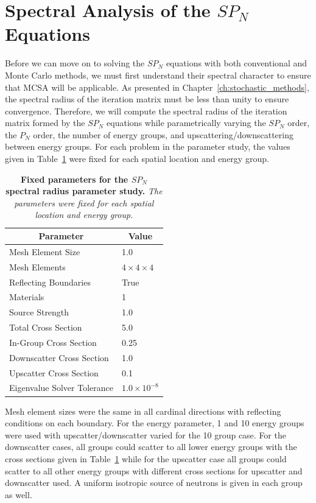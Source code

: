 \section{Spectral Analysis of the $SP_N$ Equations}
\label{sec:spn_spectral_analysis}
Before we can move on to solving the $SP_N$ equations with both
conventional and Monte Carlo methods, we must first understand their
spectral character to ensure that MCSA will be applicable. As
presented in Chapter~\ref{ch:stochastic_methods}, the spectral radius
of the iteration matrix must be less than unity to ensure
convergence. Therefore, we will compute the spectral radius of the
iteration matrix formed by the $SP_N$ equations while parametrically
varying the $SP_N$ order, the $P_N$ order, the number of energy
groups, and upscattering/downscattering between energy groups. For
each problem in the parameter study, the values given in
Table~\ref{tab:spn_fixed_parameters} were fixed for each spatial
location and energy group.
\begin{table}[h!]
  \begin{center}
    \begin{tabular}{ll}\hline\hline
      \multicolumn{1}{c}{Parameter}& 
      \multicolumn{1}{c}{Value} \\\hline
      Mesh Element Size & 1.0 \\
      Mesh Elements & $4 \times 4 \times 4$ \\
      Reflecting Boundaries & True \\
      Materials & 1 \\
      Source Strength & 1.0 \\
      Total Cross Section & 5.0 \\
      In-Group Cross Section & 0.25 \\
      Downscatter Cross Section & 1.0 \\
      Upscatter Cross Section & 0.1 \\
      Eigenvalue Solver Tolerance & $1.0\times10^{-8}$ \\
      \hline\hline
    \end{tabular}
  \end{center}
  \caption{\textbf{Fixed parameters for the $SP_N$ spectral radius
      parameter study.} \textit{The parameters were fixed for each
      spatial location and energy group.}}
  \label{tab:spn_fixed_parameters}
\end{table}
Mesh element sizes were the same in all cardinal directions with
reflecting conditions on each boundary. For the energy parameter, 1
and 10 energy groups were used with upscatter/downscatter varied for
the 10 group case. For the downscatter cases, all groups could scatter
to all lower energy groups with the cross sections given in
Table~\ref{tab:spn_fixed_parameters} while for the upscatter case all
groups could scatter to all other energy groups with different cross
sections for upscatter and downscatter used. A uniform isotropic
source of neutrons is given in each group as well.

